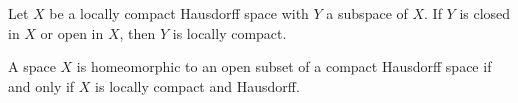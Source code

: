  \begin{corollary}
    Let $X$ be a locally compact Hausdorff space with $Y$ a subspace of $X$. If $Y$ is closed in $X$ or open in $X$, then $Y$ is locally compact. 
  \end{corollary}

  \begin{corollary}
    A space $X$ is homeomorphic to an open subset of a compact Hausdorff space if and only if $X$ is locally compact and Hausdorff. 
  \end{corollary}

%
%
%
%
%
